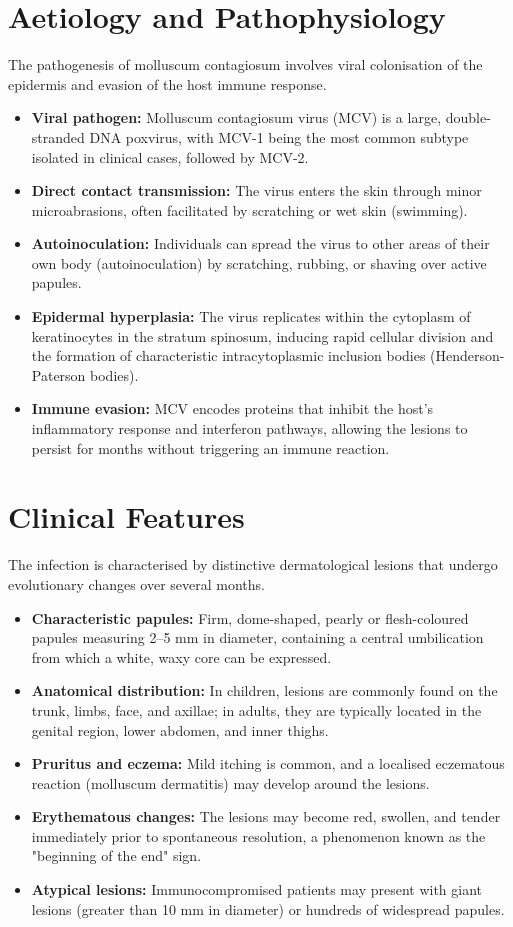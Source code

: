 \section*{Aetiology and Pathophysiology}
The pathogenesis of molluscum contagiosum involves viral colonisation of the epidermis and evasion of the host immune response.
\begin{itemize}
    \item \textbf{Viral pathogen:} Molluscum contagiosum virus (MCV) is a large, double-stranded DNA poxvirus, with MCV-1 being the most common subtype isolated in clinical cases, followed by MCV-2.
    \item \textbf{Direct contact transmission:} The virus enters the skin through minor microabrasions, often facilitated by scratching or wet skin (swimming).
    \item \textbf{Autoinoculation:} Individuals can spread the virus to other areas of their own body (autoinoculation) by scratching, rubbing, or shaving over active papules.
    \item \textbf{Epidermal hyperplasia:} The virus replicates within the cytoplasm of keratinocytes in the stratum spinosum, inducing rapid cellular division and the formation of characteristic intracytoplasmic inclusion bodies (Henderson-Paterson bodies).
    \item \textbf{Immune evasion:} MCV encodes proteins that inhibit the host's inflammatory response and interferon pathways, allowing the lesions to persist for months without triggering an immune reaction.
\end{itemize}

\section*{Clinical Features}
The infection is characterised by distinctive dermatological lesions that undergo evolutionary changes over several months.
\begin{itemize}
    \item \textbf{Characteristic papules:} Firm, dome-shaped, pearly or flesh-coloured papules measuring 2--5 mm in diameter, containing a central umbilication from which a white, waxy core can be expressed.
    \item \textbf{Anatomical distribution:} In children, lesions are commonly found on the trunk, limbs, face, and axillae; in adults, they are typically located in the genital region, lower abdomen, and inner thighs.
    \item \textbf{Pruritus and eczema:} Mild itching is common, and a localised eczematous reaction (molluscum dermatitis) may develop around the lesions.
    \item \textbf{Erythematous changes:} The lesions may become red, swollen, and tender immediately prior to spontaneous resolution, a phenomenon known as the "beginning of the end" sign.
    \item \textbf{Atypical lesions:} Immunocompromised patients may present with giant lesions (greater than 10 mm in diameter) or hundreds of widespread papules.
\end{itemize}

